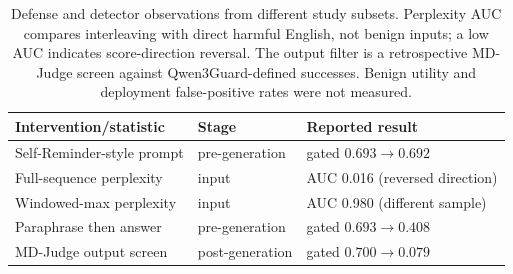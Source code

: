 \begin{table}[t]\centering
\small
\setlength{\tabcolsep}{3.5pt}
\caption{Defense and detector observations from different study subsets. Perplexity AUC compares interleaving with direct harmful English, not benign inputs; a low AUC indicates score-direction reversal. The output filter is a retrospective MD-Judge screen against Qwen3Guard-defined successes. Benign utility and deployment false-positive rates were not measured.}
\label{tab:defense2}
\begin{tabular}{l l l}\toprule
Intervention/statistic & Stage & Reported result \\\midrule
Self-Reminder-style prompt & pre-generation & gated $0.693\to0.692$ \\
Full-sequence perplexity & input & AUC 0.016 (reversed direction) \\
Windowed-max perplexity & input & AUC 0.980 (different sample) \\
Paraphrase then answer & pre-generation & gated $0.693\to0.408$ \\
MD-Judge output screen & post-generation & gated $0.700\to0.079$ \\
\bottomrule\end{tabular}\end{table}
